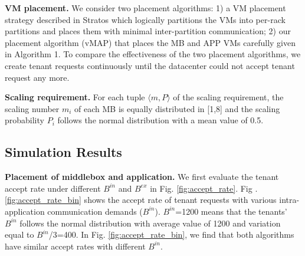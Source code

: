 \documentclass[review]{elsarticle}
\begin{document}
\textbf{VM placement.} We consider two placement algorithms: 1) a VM placement strategy 
described in Stratos \cite{stratos12} which logically partitions the VMs into per-rack partitions and places them with minimal inter-partition communication; 2) our placement algorithm (vMAP) that places the MB and APP VMs carefully given in Algorithm 1. To compare the effectiveness of the two placement algorithms, we create tenant requests continuously until the datacenter could not accept tenant request any more.

\textbf{Scaling requirement.} For each tuple $\langle m, P\rangle$ of the scaling requirement, the scaling number $m_i$ of each MB is equally distributed in [1,8] and the scaling probability $P_i$ follows the normal distribution with a mean value of 0.5. 
\subsection{Simulation Results}
\textbf{Placement of middlebox and application.} We first evaluate the tenant accept rate under different $B^{in}$ and $B^{ex}$ in Fig. \ref{fig:accept_rate}.
Fig .\ref{fig:accept_rate_bin} shows 
the accept rate of tenant requests with various intra-application communication demands ($B^{in}$). $B^{in}$=1200 means that the tenants' $B^{in}$ follows the normal distribution with average value of 1200 and variation equal to $B^{in}$/3=400. In Fig. \ref{fig:accept_rate_bin}, we find that both algorithms have similar accept rates with different $B^{in}$. 
\end{document}
